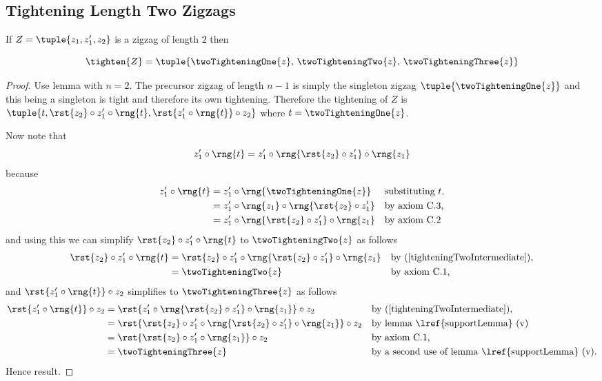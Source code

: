 \subsection{Tightening Length Two Zigzags}
{%

\begin{lemma}
If $Z=\tuple{z_1,z'_1,z_2}$ is a zigzag of length $2$
then

\[
\tighten{Z}=\tuple{ \twoTighteningOne{z},
                     \,\twoTighteningTwo{z},
                     \,\twoTighteningThree{z}}
\]
\end{lemma}
\begin{proof}
\newcommand {\longTighteningTwo}{\rst{z_2} \circ z'_1 \circ \rng{t}}
\newcommand {\longTighteningThree}{\rst{z'_1 \circ \rng{t}} \circ z_2}
Use lemma  with $n=2$. The precursor zigzag of length $n-1$ is simply the singleton zigzag \nudgeup{0.55cm}$\tuple{\twoTighteningOne{z}}$ and this being a  singleton is tight and therefore its own tightening. Therefore the tightening of $Z$ is 
\nudgeup{0.55cm}$\tuple{t, \longTighteningTwo,\longTighteningThree}$
where $t = \twoTighteningOne{z}$. 

Now note that 
\begin{equation}
\label{tighteningTwoIntermediate}
z'_1 \circ \rng{t} = z'_1 \circ \rng{\rst{z_2} \circ z'_1} \circ \rng{z_1}
\end{equation}  
because
\begin{align*}
z'_1 \circ \rng{t} 
     &= z'_1 \circ \rng{\twoTighteningOne{z}} 
     && \mbox{substituting $t$,}\\
     &= z'_1 \circ \rng{z_1} \circ \rng{\rst{z_2} \circ z'_1} 
     && \mbox{by  axiom C.3,}\\
     &= z'_1 \circ \rng{\rst{z_2} \circ z'_1}  \circ \rng{z_1}
     && \mbox{by axiom C.2}
\end{align*}
and using this we can simplify
$\longTighteningTwo$  to $\twoTighteningTwo{z}$ as follows
\begin{align*}
\longTighteningTwo 
    &= \rst{z_2} \circ z'_1 \circ \rng{\rst{z_2} \circ z'_1} \circ \rng{z_1}
                   && \mbox{by (\ref{tighteningTwoIntermediate}),}\\
    &= \twoTighteningTwo{z}
                   && \mbox{by axiom C.1,}
\end{align*}
and  $\longTighteningThree$ simplifies to $\twoTighteningThree{z}$ as follows
\begin{align*}
\longTighteningThree 
     &= \rst{z'_1 \circ \rng{\rst{z_2} \circ z'_1} \circ\rng{z_1}} \circ z_2
     && \mbox{by (\ref{tighteningTwoIntermediate}),}\\
     &= \rst{\rst{z_2} \circ z'_1 \circ \rng{\rst{z_2} \circ z'_1} \circ\rng{z_1}
      } \circ z_2
     && \mbox{by  lemma \lref{supportLemma} (v)}\\
     &= \rst{\rst{z_2} \circ z'_1 \circ\rng{z_1}} \circ z_2 
     && \mbox {by axiom C.1,}\\ 
     &= \twoTighteningThree{z}
     && \mbox{by a second use of lemma \lref{supportLemma} (v).}
\end{align*} 
Hence result.
\end{proof}

}
